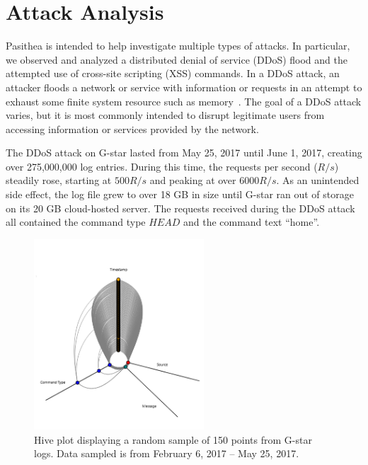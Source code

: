 
\section{Attack Analysis} \label{analysis}

Pasithea is intended to help investigate multiple types of attacks.
In particular, we observed and analyzed a distributed denial of service (DDoS) flood and the attempted use of cross-site scripting (XSS) commands.
In a DDoS attack, an attacker floods a network or service with information or requests in an attempt to exhaust some finite system resource such as memory~\cite{DoS-Def}. 
The goal of a DDoS attack varies, but it is most commonly intended to disrupt legitimate users from accessing information or services provided by the network.

The DDoS attack on G-star lasted from May 25, 2017 until June 1, 2017, creating over 275,000,000 log entries. 
During this time, the requests per second ($R/s$) steadily rose, starting at $500 R/s$ and peaking at over $6000 R/s$. 
As an unintended side effect, the log file grew to over 18 GB in size until G-star ran out of storage on its 20 GB cloud-hosted server.
The requests received during the DDoS attack all contained the command type $HEAD$ and the command text ``home''.

\begin{figure}[b]
   \centering
   \includegraphics[width=2.5in]{images/regHive.png} 
   \caption{Hive plot displaying a random sample of 150 points from G-star logs. Data sampled is from February 6, 2017 -- May 25, 2017.}
   \label{fig:regHive}
\end{figure}


